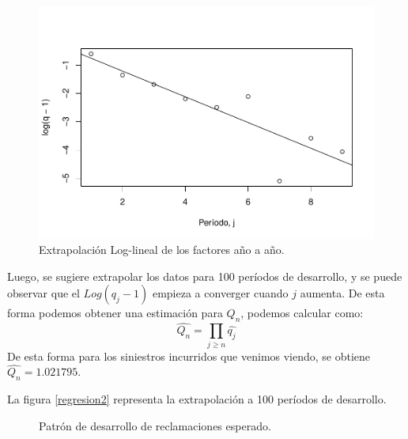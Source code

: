 \documentclass[
  12pt,
]{article}
\begin{document}
\begin{figure}[H]
\includegraphics[width=1\linewidth]{informe_files/figure-latex/unnamed-chunk-9-1} \caption{\label{regresion} Extrapolación Log-lineal de los factores año a año.}\label{fig:unnamed-chunk-9}
\end{figure}

Luego, se sugiere extrapolar los datos para 100 períodos de desarrollo,
y se puede observar que el \(Log(q_j -1)\) empieza a converger cuando
\(j\) aumenta. De esta forma podemos obtener una estimación para
\(Q_n\), podemos calcular como:
\[\hat{Q_n} = \prod_{j\geq n} \hat{q_{j}} \] De esta forma para los
siniestros incurridos que venimos viendo, se obtiene
\(\hat{Q_n} = 1.021795\).

La figura \ref{regresion2} representa la extrapolación a 100 períodos de
desarrollo.

\begin{figure}
\caption{\label{regresion2} Patrón de desarrollo de reclamaciones esperado.}\label{fig:unnamed-chunk-10}
\end{figure}
\end{document}
